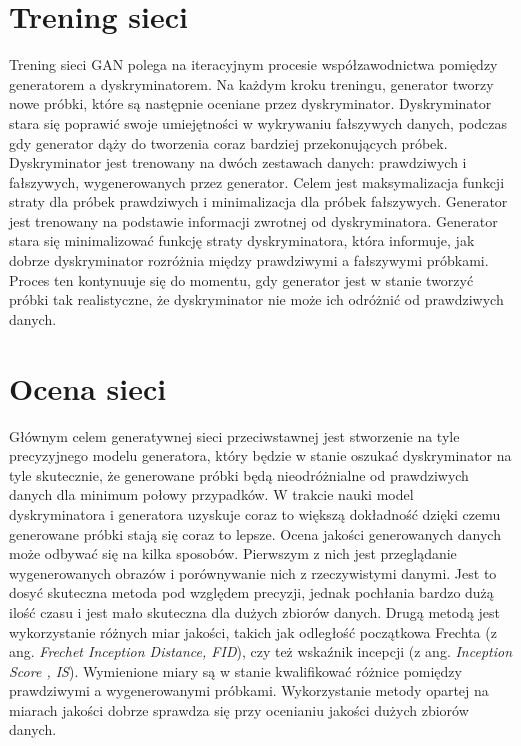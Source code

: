 \documentclass[eng,printmode]{mgr}
\begin{document}
\section{Trening sieci}


Trening sieci GAN polega na iteracyjnym procesie współzawodnictwa pomiędzy generatorem a dyskryminatorem. Na każdym kroku treningu, generator tworzy nowe próbki, które są następnie oceniane przez dyskryminator. Dyskryminator stara się poprawić swoje umiejętności w wykrywaniu fałszywych danych, podczas gdy generator dąży do tworzenia coraz bardziej przekonujących próbek. Dyskryminator jest trenowany na dwóch zestawach danych: prawdziwych i fałszywych, wygenerowanych przez generator. Celem jest maksymalizacja funkcji straty dla próbek prawdziwych i minimalizacja dla próbek fałszywych. Generator jest trenowany na podstawie informacji zwrotnej od dyskryminatora. Generator stara się minimalizować funkcję straty dyskryminatora, która informuje, jak dobrze dyskryminator rozróżnia między prawdziwymi a fałszywymi próbkami. Proces ten kontynuuje się do momentu, gdy generator jest w stanie tworzyć próbki tak realistyczne, że dyskryminator nie może ich odróżnić od prawdziwych danych.


\section{Ocena sieci}


Głównym celem generatywnej sieci przeciwstawnej jest stworzenie na tyle precyzyjnego modelu generatora,  który będzie w stanie oszukać dyskryminator na tyle skutecznie, że generowane próbki będą nieodróżnialne od prawdziwych danych dla minimum połowy przypadków. W trakcie nauki model dyskryminatora i generatora uzyskuje coraz to większą dokładność dzięki czemu generowane próbki stają się coraz to lepsze. Ocena jakości generowanych danych może odbywać się na kilka sposobów. Pierwszym z nich jest przeglądanie wygenerowanych obrazów i porównywanie nich z rzeczywistymi danymi. Jest to dosyć skuteczna metoda pod względem precyzji, jednak pochłania bardzo dużą ilość czasu i jest mało skuteczna dla dużych zbiorów danych.  Drugą metodą jest wykorzystanie różnych miar jakości, takich jak odległość początkowa Frechta (z ang. \textit{Frechet Inception Distance, FID}), czy też wskaźnik incepcji (z ang. \textit{Inception Score , IS}). Wymienione miary są w stanie kwalifikować różnice pomiędzy prawdziwymi a wygenerowanymi próbkami. Wykorzystanie metody opartej na miarach jakości dobrze sprawdza się przy ocenianiu jakości dużych zbiorów danych. 
\end{document}
